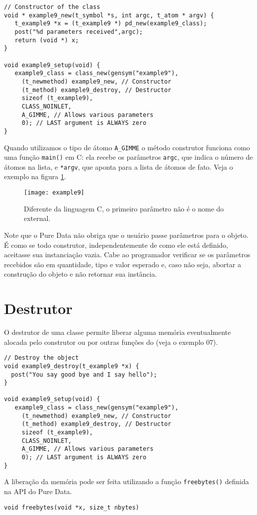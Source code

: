 \begin{lstlisting}
// Constructor of the class
void * example9_new(t_symbol *s, int argc, t_atom * argv) {
   t_example9 *x = (t_example9 *) pd_new(example9_class);
   post("%d parameters received",argc);
   return (void *) x;
}

void example9_setup(void) {
   example9_class = class_new(gensym("example9"),
     (t_newmethod) example9_new, // Constructor
     (t_method) example9_destroy, // Destructor
     sizeof (t_example9),
     CLASS_NOINLET,
     A_GIMME, // Allows various parameters
     0); // LAST argument is ALWAYS zero
}
\end{lstlisting}

Quando utilizamos o tipo de átomo \texttt{A\_GIMME} o método construtor
funciona como uma função \texttt{main()} em C: ela recebe os parâmetros
\texttt{argc}, que indica o número de átomos na lista, e \texttt{*argv}, que
aponta para a lista de átomos de fato. Veja o exemplo na figura
\ref{fig:construtor-parametros}.

\begin{figure}[h!]
\centering
\texttt{[image: example9]}
\caption{Diferente da linguagem C, o primeiro parâmetro não é o nome do external.}
\label{fig:construtor-parametros}
\end{figure}

Note que o Pure Data não obriga que o usuário passe parâmetros para o objeto. É
como se todo construtor, independentemente de como ele está definido, aceitasse
sua instanciação vazia. Cabe ao programador verificar se os parâmetros
recebidos são em quantidade, tipo e valor esperado e, caso não seja, abortar a
construção do objeto e não retornar sua instância.

\section{Destrutor}

O destrutor de uma classe permite liberar alguma memória eventualmente alocada
pelo construtor ou por outras funções do \external (veja o exemplo 07).

\begin{lstlisting}
// Destroy the object
void example9_destroy(t_example9 *x) {
  post("You say good bye and I say hello");
}

void example9_setup(void) {
   example9_class = class_new(gensym("example9"),
     (t_newmethod) example9_new, // Constructor
     (t_method) example9_destroy, // Destructor
     sizeof (t_example9),
     CLASS_NOINLET,
     A_GIMME, // Allows various parameters
     0); // LAST argument is ALWAYS zero
}
\end{lstlisting}

A liberação da memória pode ser feita utilizando a função \texttt{freebytes()}
definida na API do Pure Data.

\begin{lstlisting}
void freebytes(void *x, size_t nbytes)
\end{lstlisting}

